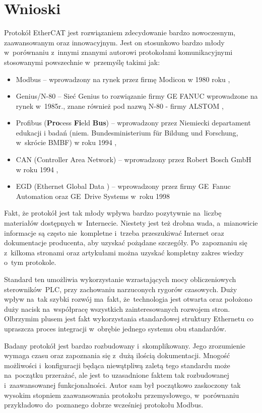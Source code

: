 \section{Wnioski}
Protokół EtherCAT jest rozwiązaniem zdecydowanie bardzo nowoczesnym, zaawansowanym oraz innowacyjnym. 
Jest on stosunkowo bardzo młody w~porównaniu z~innymi znanymi autorowi protokołami komunikacyjnymi stosowanymi powszechnie w~przemyślę takimi jak:
\begin{itemize}
\item Modbus -- wprowadzony na rynek przez firmę Modicon w 1980 roku \cite{kwiecien},
\item Genius/N-80 -- Sieć Genius to rozwiązanie firmy GE FANUC wprowadzone na rynek w~1985r., znane również pod nazwą N-80 - firmy ALSTOM \cite{kwiecien},
\item Profibus (\textbf{Pro}cess \textbf{Fi}eld \textbf{Bus}) -- wprowadzony przez Niemiecki departament edukacji i badań (niem. Bundesministerium für Bildung und Forschung, w~skrócie BMBF) w roku 1994 \cite{kwiecien},
\item CAN (Controller Area Network) -- wprowadzony przez Robert Bosch GmbH w roku 1994 \cite{kwiecien},
\item EGD (Ethernet Global Data ) -- wprowadzony przez firmy GE~Fanuc Automation oraz GE~Drive Systems w~roku 1998
\end{itemize}

Fakt, że protokół jest tak młody wpływa bardzo pozytywnie na~liczbę materiałów dostępnych w~Internecie. Niestety jest też drobna wada, a~mianowicie informacje są często nie~kompletne i~trzeba przeszukiwać Internet oraz dokumentacje producenta, aby uzyskać pożądane szczegóły. Po~zapoznaniu się z~kilkoma stronami oraz artykułami można uzyskać kompletny zakres wiedzy o~tym protokole.

Standard ten umożliwia wykorzystanie wzrastających mocy obliczeniowych sterowników~PLC, przy zachowaniu narzuconych rygorów czasowych. Duży wpływ na~tak szybki rozwój ma~fakt, że~technologia jest otwarta oraz położono duży nacisk na~współpracę wszystkich zainteresowanych rozwojem stron. Olbrzymim plusem jest fakt wykorzystania standardowej struktury Ethernetu co upraszcza proces integracji w~obrębie jednego systemu obu standardów.

Badany protokół jest bardzo rozbudowany i~skomplikowany. Jego zrozumienie wymaga czasu oraz zapoznania się z~dużą ilością dokumentacji. Mnogość możliwości i~konfiguracji będąca niewątpliwą zaletą tego standardu może na~początku przerażać, ale jest to uzasadnione faktem tak rozbudowanej i~zaawansowanej funkcjonalności. Autor sam był początkowo zaskoczony tak wysokim stopniem zaawansowania protokołu przemysłowego, w~porównaniu przykładowo do~poznanego dobrze wcześniej protokołu Modbus.

